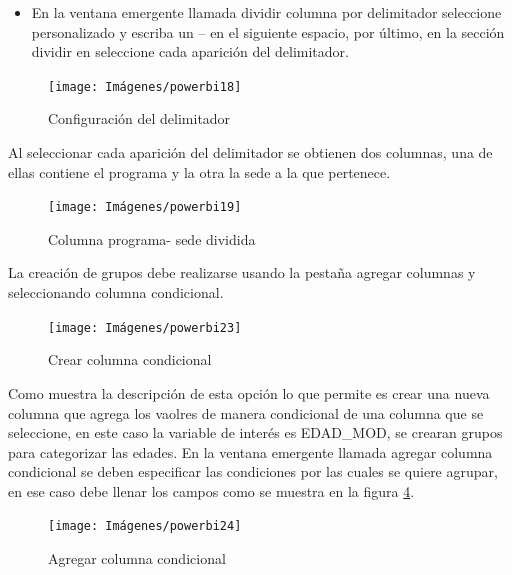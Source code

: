 \documentclass[
]{book}
\providecommand{\tightlist}{%
  \setlength{\itemsep}{0pt}\setlength{\parskip}{0pt}}
\begin{document}
\begin{itemize}
\tightlist
\item
  En la ventana emergente llamada dividir columna por delimitador seleccione personalizado y escriba un -- en el siguiente espacio, por último, en la sección dividir en seleccione cada aparición del delimitador.
\end{itemize}

\begin{figure}

{\centering \texttt{[image: Imágenes/powerbi18]} 

}

\caption{Configuración del delimitador}\label{fig:configuraciondeldelimitador-fig}
\end{figure}

Al seleccionar cada aparición del delimitador se obtienen dos columnas, una de ellas contiene el programa y la otra la sede a la que pertenece.

\begin{figure}

{\centering \texttt{[image: Imágenes/powerbi19]} 

}

\caption{Columna programa- sede dividida}\label{fig:columnadivididacondelimitador-fig}
\end{figure}

La creación de grupos debe realizarse usando la pestaña agregar columnas y seleccionando columna condicional.

\begin{figure}

{\centering \texttt{[image: Imágenes/powerbi23]} 

}

\caption{Crear columna condicional}\label{fig:columnacondicional-fig}
\end{figure}

Como muestra la descripción de esta opción lo que permite es crear una nueva columna que agrega los vaolres de manera condicional de una columna que se seleccione, en este caso la variable de interés es EDAD\_MOD, se crearan grupos para categorizar las edades. En la ventana emergente llamada agregar columna condicional se deben especificar las condiciones por las cuales se quiere agrupar, en ese caso debe llenar los campos como se muestra en la figura \ref{fig:agregarcolumnacondicional-fig}.

\begin{figure}

{\centering \texttt{[image: Imágenes/powerbi24]} 

}

\caption{Agregar columna condicional}\label{fig:agregarcolumnacondicional-fig}
\end{figure}
\end{document}
